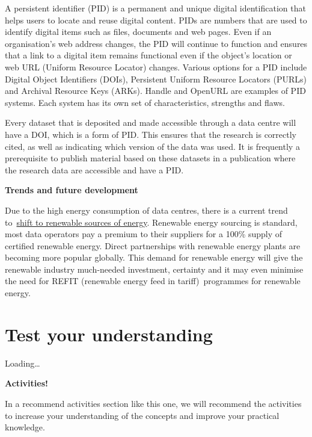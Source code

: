 \documentclass[
]{book}
\begin{document}
A persistent identifier (PID) is a permanent and unique digital identification that helps users to locate and reuse digital content. PIDs are numbers that are used to identify digital items such as files, documents and web pages. Even if an organisation's web address changes, the PID will continue to function and ensures that a link to a digital item remains functional even if the object's location or web URL (Uniform Resource Locator) changes. Various options for a PID include Digital Object Identifiers (DOIs), Persistent Uniform Resource Locators (PURLs) and Archival Resource Keys (ARKs). Handle and OpenURL are examples of PID systems. Each system has its own set of characteristics, strengths and flaws.

Every dataset that is deposited and made accessible through a data centre will have a DOI, which is a form of PID. This ensures that the research is correctly cited, as well as indicating which version of the data was used. It is frequently a prerequisite to publish material based on these datasets in a publication where the research data are accessible and have a PID.

\textbf{Trends and future development}

Due to the high energy consumption of data centres, there is a current trend to~\href{https://bitpower.ie/images/Reports/2021_H1_Report.pdf}{}\href{https://bitpower.ie/images/Reports/2021_H1_Report.pdf}{shift to renewable sources of energy}. Renewable energy sourcing is standard, most data operators pay a premium to their suppliers for a 100\% supply of certified renewable energy. Direct partnerships with renewable energy plants are becoming more popular globally. This demand for renewable energy will give the renewable industry much-needed investment, certainty and it may even minimise the need for REFIT (renewable energy feed in tariff)~programmes for renewable energy.

\hypertarget{test-your-understanding-6}{%
\section{Test your understanding}\label{test-your-understanding-6}}

Loading\ldots{}

\textbf{Activities!}

In a recommend activities section like this one, we will recommend the activities to increase your understanding of the concepts and improve your practical knowledge.
\end{document}
